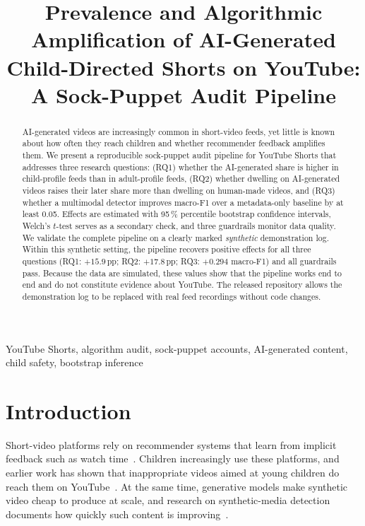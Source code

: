 \documentclass[conference]{IEEEtran}
\begin{document}
\title{Prevalence and Algorithmic Amplification of AI-Generated Child-Directed Shorts on YouTube: A Sock-Puppet Audit Pipeline}

\author{
}

\maketitle

\begin{abstract}
AI-generated videos are increasingly common in short-video feeds, yet little is known about how often they reach children and whether recommender feedback amplifies them. We present a reproducible sock-puppet audit pipeline for YouTube Shorts that addresses three research questions: (RQ1) whether the AI-generated share is higher in child-profile feeds than in adult-profile feeds, (RQ2) whether dwelling on AI-generated videos raises their later share more than dwelling on human-made videos, and (RQ3) whether a multimodal detector improves macro-F1 over a metadata-only baseline by at least 0.05. Effects are estimated with 95\,\% percentile bootstrap confidence intervals, Welch's $t$-test serves as a secondary check, and three guardrails monitor data quality. We validate the complete pipeline on a clearly marked \emph{synthetic} demonstration log. Within this synthetic setting, the pipeline recovers positive effects for all three questions (RQ1: $+15.9$\,pp; RQ2: $+17.8$\,pp; RQ3: $+0.294$ macro-F1) and all guardrails pass. Because the data are simulated, these values show that the pipeline works end to end and do not constitute evidence about YouTube. The released repository allows the demonstration log to be replaced with real feed recordings without code changes.
\end{abstract}

\begin{IEEEkeywords}
YouTube Shorts, algorithm audit, sock-puppet accounts, AI-generated content, child safety, bootstrap inference
\end{IEEEkeywords}

\section{Introduction}\label{sec:intro}
Short-video platforms rely on recommender systems that learn from implicit feedback such as watch time~\cite{covington2016}. Children increasingly use these platforms, and earlier work has shown that inappropriate videos aimed at young children do reach them on YouTube~\cite{papadamou2020}. At the same time, generative models make synthetic video cheap to produce at scale, and research on synthetic-media detection documents how quickly such content is improving~\cite{mirsky2021,rossler2019}.
\end{document}
